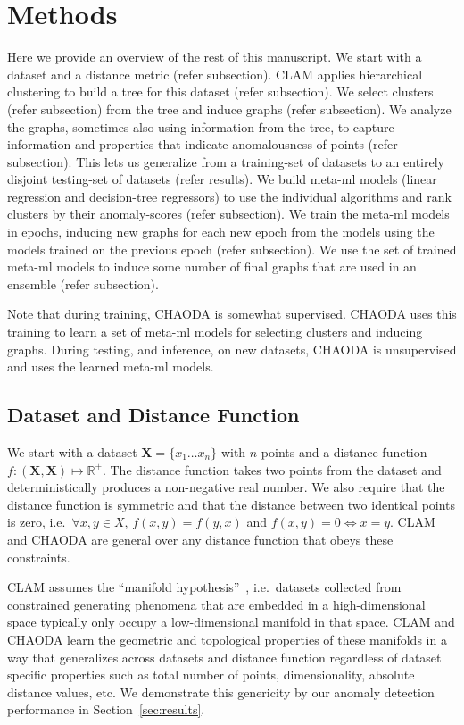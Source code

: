 \section{Methods}
\label{sec:methods}

Here we provide an overview of the rest of this manuscript.
We start with a dataset and a distance metric (refer subsection).
CLAM applies hierarchical clustering to build a tree for this dataset (refer subsection).
We select clusters (refer subsection) from the tree and induce graphs (refer subsection).
We analyze the graphs, sometimes also using information from the tree, to capture information and properties that indicate anomalousness of points (refer subsection).
This lets us generalize from a training-set of datasets to an entirely disjoint testing-set of datasets (refer results).
We build meta-ml models (linear regression and decision-tree regressors) to use the individual algorithms and rank clusters by their anomaly-scores (refer subsection).
We train the meta-ml models in epochs, inducing new graphs for each new epoch from the models using the models trained on the previous epoch (refer subsection).
We use the set of trained meta-ml models to induce some number of final graphs that are used in an ensemble (refer subsection).

Note that during training, CHAODA is somewhat supervised.
CHAODA uses this training to learn a set of meta-ml models for selecting clusters and inducing graphs.
During testing, and inference, on new datasets, CHAODA is unsupervised and uses the learned meta-ml models.


\subsection{Dataset and Distance Function}
\label{subsec:methods:dataset-and-distance-function}

We start with a dataset $\textbf{X} = \{x_1 \dots x_n\}$ with $n$ points and a distance function $f : (\textbf{X}, \textbf{X}) \mapsto \mathbb{R}^+$.
The distance function takes two points from the dataset and deterministically produces a non-negative real number.
We also require that the distance function is symmetric and that the distance between two identical points is zero, i.e.\ $\forall x, y \in X$, $f(x, y) = f(y, x)$ and $f(x, y) = 0 \Leftrightarrow x = y$.
CLAM and CHAODA are general over any distance function that obeys these constraints.

CLAM assumes the ``manifold hypothesis''~\cite{fefferman2016testing}, i.e.\ datasets collected from constrained generating phenomena that are embedded in a high-dimensional space typically only occupy a low-dimensional manifold in that space.
CLAM and CHAODA learn the geometric and topological properties of these manifolds in a way that generalizes across datasets and distance function regardless of dataset specific properties such as total number of points, dimensionality, absolute distance values, etc.
We demonstrate this genericity by our anomaly detection performance in Section~\ref{sec:results}.

